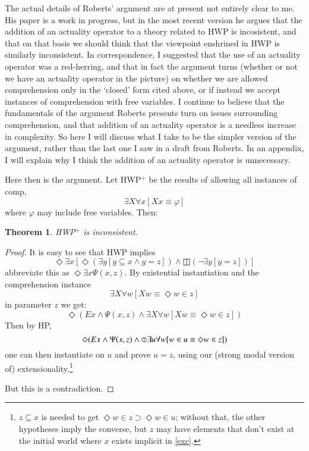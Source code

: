 \documentclass{article}
\newtheorem{theorem}{Theorem}
\begin{document}
The actual details of Roberts' argument are at present not entirely 
clear to me. His paper is a work in progress, but in the most 
recent version he argues that the addition of an actuality operator 
to a theory related to HWP is incosistent, and that on that basis 
we should think that the viewpoint enshrined in HWP is similarly inconsistent.
In correspondence, I suggested that the use of an actuality operator 
was a red-herring, and that in fact the argument turns (whether or not 
we have an actuality operator in the picture) on whether we are allowed 
comprehension only in the `closed' form cited above, or if instead 
we accept instances of comprehension with free variables. I continue 
to believe that the fundamentals of the argument Roberts presents turn 
on issues surrounding comprehension, and that addition of an actuality 
operator is a needless increase in complexity. So here I will discuss 
what I take to be the simpler version of the argument, rather than 
the last one I saw in a draft from Roberts. In an appendix, I will 
explain why I think the addition of an actuality operator is unnecessary.

Here then is the argument. Let HWP$^+$ be the 
results of allowing all instances of comp, 
\[ \exists X \forall x[Xx \equiv \varphi]\]
where $\varphi$ may include free variables. Then:
\begin{theorem}
    HWP$^+$ is inconsistent.
\end{theorem}
\begin{proof}
    It is easy to see that HWP implies
    \begin{equation}
        \Diamond \exists x[\Diamond (\exists y[ y \subseteq x \wedge y = z]) \wedge \boxbar(\neg \exists y[y = z])]
    \end{equation}
    abbreviate this as $\Diamond \exists x \Psi(x, z)$. By 
    existential instantiation and the comprehension instance
    \begin{equation}\label{exa}
        \exists X \forall w[Xw \equiv \Diamond w \in z]
    \end{equation}
    in parameter $z$ we get:
    \begin{equation}\label{exb}
        \Diamond (Ex \wedge \Psi(x, z) \wedge \exists X \forall w[Xw \equiv \Diamond w \in z])
    \end{equation}
    Then by HP, 
    \begin{equation}\label{exc}
        \Diamond (Ex \wedge \Psi(x, z) \wedge \circledbar \exists u \forall w[w \in u \equiv \Diamond w \in z])
    \end{equation}
    one can then instantiate on $u$ and prove $u = z$, using our (strong 
    modal version of) extensionality.\footnote{$z \subseteq x$ is needed
    to get $\Diamond w \in z \supset \Diamond w \in u$; without that, 
    the other hypotheses imply the converse, but $z$ may have elements that 
    don't exist at the initial world where $x$ exists implicit in \eqref{exc}.}

    But this is a contradiction.

\end{proof}
\end{document}
